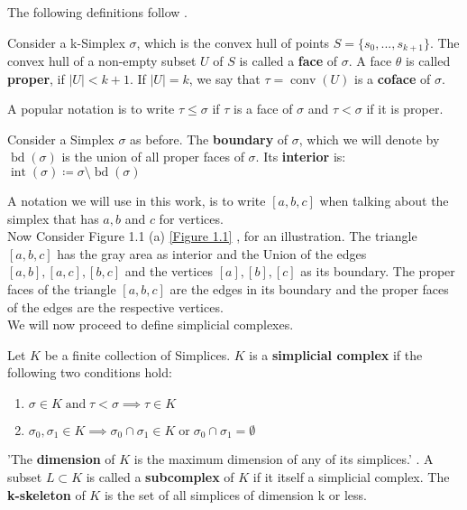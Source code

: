 The following definitions follow \cite[III.1]{Computational+Topology}.

\begin{defi}
    Consider a k-Simplex $\sigma$, which is the convex hull of points $S = \{s_0, ... , s_{k+1}\}$. The convex hull of a non-empty subset $U$ of $S$ is called a \textbf{face} of $\sigma$.
    A face $\theta$ is called \textbf{proper}, if $|U| < k+1$. If $|U| = k$, we say that $\tau = \operatorname{conv}(U)$ is a \textbf{coface} of $\sigma$.
\end{defi}

A popular notation is to write $\tau \leq \sigma$ if $\tau$ is a face of $\sigma$ and $\tau < \sigma$ if it is proper.

\begin{defi}
    Consider a Simplex $\sigma$ as before. The \textbf{boundary} of $\sigma$, which we will denote by $\operatorname{bd}(\sigma)$ is the union of all proper faces of $\sigma$. Its \textbf{interior}
    is: $\operatorname{int}(\sigma) \coloneqq \sigma\setminus\operatorname{bd}(\sigma)$
\end{defi}

A notation we will use in this work, is to write $[a,b,c]$ when talking about the simplex that has $a,b$ and $c$ for vertices.\\
Now Consider Figure 1.1 (a) \ref{Figure 1.1} , for an illustration.
The triangle $[a,b,c]$ has the gray area as interior and the Union of the edges $[a,b],[a,c],[b,c]$ and the vertices $[a],[b],[c]$
as its boundary. The proper faces of the triangle $[a,b,c]$  are the edges in its boundary and the proper faces of the edges are the respective vertices. \\
We will now proceed to define simplicial complexes.

\begin{defi}
    Let $K$ be a finite collection of Simplices. $K$ is a \textbf{simplicial complex} if the following two conditions hold:
    \begin{enumerate}
        \item $\sigma \in K \operatorname{and} \tau < \sigma \implies \tau \in K$
        \item $\sigma_0, \sigma_1 \in K \implies \sigma_0 \cap \sigma_1 \in K \operatorname{or} \sigma_0 \cap \sigma_1 = \emptyset$
    \end{enumerate}
    'The \textbf{dimension} of $K$ is the maximum dimension of any of its simplices.' \cite[p. 63, paragraph 4]{Computational+Topology}.
    A subset $L \subset K$ is called a \textbf{subcomplex} of $K$ if it itself a simplicial complex.
    The \textbf{k-skeleton} of $K$ is the set of all simplices of dimension k or less.
\end{defi}

